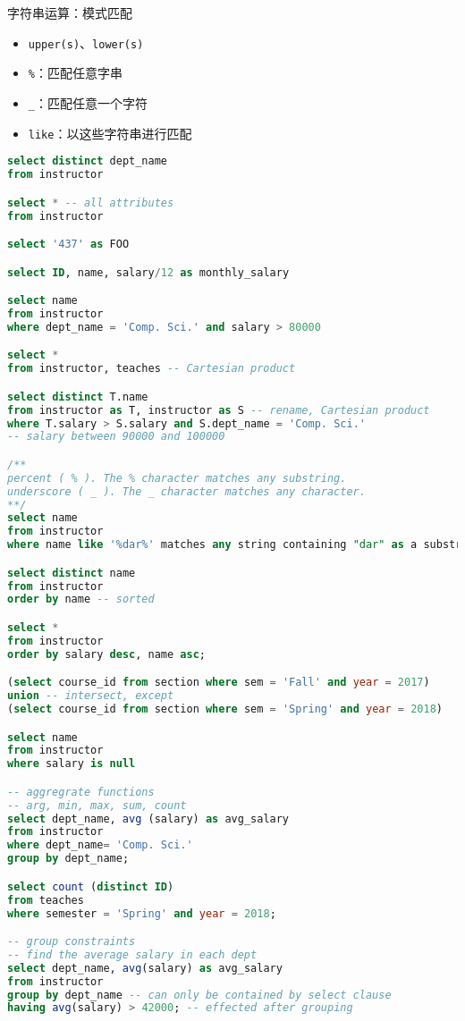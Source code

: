 字符串运算：模式匹配
\begin{itemize}
	\item \verb'upper(s)'、\verb'lower(s)'
	\item \verb'%'：匹配任意字串
	\item \verb'_'：匹配任意一个字符
	\item \verb'like'：以这些字符串进行匹配
\end{itemize}

\begin{lstlisting}[language=sql]
select distinct dept_name
from instructor

select * -- all attributes
from instructor

select '437' as FOO

select ID, name, salary/12 as monthly_salary

select name
from instructor
where dept_name = 'Comp. Sci.' and salary > 80000

select *
from instructor, teaches -- Cartesian product

select distinct T.name
from instructor as T, instructor as S -- rename, Cartesian product
where T.salary > S.salary and S.dept_name = 'Comp. Sci.'
-- salary between 90000 and 100000

/**
percent ( % ). The % character matches any substring.
underscore ( _ ). The _ character matches any character.
**/
select name
from instructor
where name like '%dar%' matches any string containing "dar" as a substring

select distinct name
from instructor
order by name -- sorted

select *
from instructor
order by salary desc, name asc;

(select course_id from section where sem = 'Fall' and year = 2017)
union -- intersect, except
(select course_id from section where sem = 'Spring' and year = 2018)

select name
from instructor
where salary is null

-- aggregrate functions
-- arg, min, max, sum, count
select dept_name, avg (salary) as avg_salary
from instructor
where dept_name= 'Comp. Sci.'
group by dept_name;

select count (distinct ID)
from teaches
where semester = 'Spring' and year = 2018;

-- group constraints
-- find the average salary in each dept
select dept_name, avg(salary) as avg_salary
from instructor
group by dept_name -- can only be contained by select clause
having avg(salary) > 42000; -- effected after grouping
\end{lstlisting}

